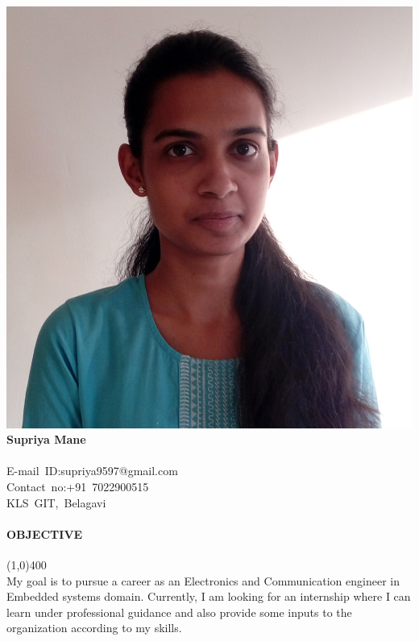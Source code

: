 \documentclass[12pt,a4paper]{article}
\begin{document}
\paragraph{}
\includegraphics[scale=0.05]{profile}
\textbf{\LARGE Supriya Mane\\}\hfill
\\
\mbox{E-mail ID:\large supriya9597@gmail.com}\\
\mbox{Contact no:\large +91 7022900515}\\
\mbox{\large KLS GIT, Belagavi}\\
\paragraph{OBJECTIVE}
\line(1,0){400}\\
My goal is to pursue a career as an Electronics and Communication engineer in Embedded systems domain. Currently, I am looking for an internship where I can learn under professional guidance and also provide some inputs to the organization according to my skills.
\end{document}
